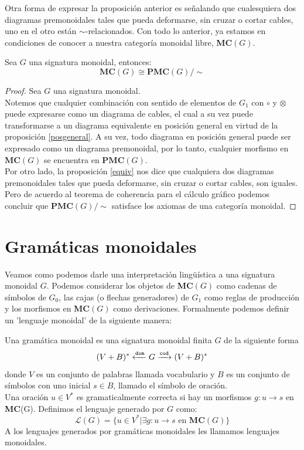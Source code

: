 \documentclass[../main.tex]{subfiles}
\begin{document}
Otra forma de expresar la proposición anterior es señalando que cualesquiera dos diagramas premonoidales tales que pueda deformarse, sin cruzar o cortar cables, uno en el otro están $\sim$-relacionados. Con todo lo anterior, ya estamos en condiciones de conocer a nuestra categoría monoidal libre, \textbf{MC}$(G)$.

\begin{prop}
	Sea $G$ una signatura monoidal, entonces:
	$$\textbf{MC}(G) \cong \textbf{PMC}(G) / \sim$$
\end{prop}

\begin{proof}
	Sea $G$ una signatura monoidal. \\
	Notemos que cualquier combinación con sentido de elementos de $G_1$ con $\circ$ y $\otimes$ puede expresarse como un diagrama de cables, el cual a su vez puede transformarse a un diagrama equivalente en posición general en virtud de la proposición \ref{posgeneral}. A su vez, todo diagrama en posición general puede ser expresado como un diagrama premonoidal, por lo tanto, cualquier morfismo en $\textbf{MC}(G)$ se encuentra en $\textbf{PMC}(G)$. \\
	Por otro lado, la proposición \ref{equiv} nos dice que cualquiera dos diagramas premonoidales tales que pueda deformarse, sin cruzar o cortar cables, son iguales. Pero de acuerdo al teorema de coherencia para el cálculo gráfico podemos concluir que $\textbf{PMC}(G) / \sim$ satisface los axiomas de una categoría monoidal. 
\end{proof}

\section{Gramáticas monoidales}

Veamos como podemos darle una interpretación lingüística a  una signatura monoidal $G$. Podemos considerar los objetos de \textbf{MC}$(G)$ como cadenas de símbolos de $G_0$, las cajas (o flechas generadores) de $G_1$ como reglas de producción y los morfismos en \textbf{MC}$(G)$ como derivaciones. Formalmente podemos definir un 'lenguaje monoidal' de la siguiente manera:

\begin{dfn}
	Una gramática monoidal es una signatura monoidal finita $G$ de la siguiente forma
	$$(V+B)^* \xleftarrow{\tt{dom}} G \xrightarrow{\tt{cod}} (V+B)^*$$
	donde $V$ es un conjunto de palabras llamada vocabulario y $B$ es un conjunto de símbolos con uno inicial $s \in B$, llamado el símbolo de oración. \\
	Una oración $u \in V^*$ es gramaticalmente correcta si hay un morfismos $g:u \to s$ en \textbf{MC}(G). Definimos el lenguaje generado por $G$ como:
	$$\mathcal{L}(G)= \{ u \in V^* | \exists g: u \to s \text{ en } \textbf{MC}(G)\}$$
	A los lenguajes generados por gramáticas monoidales les llamamos lenguajes monoidales. 
\end{dfn}
\end{document}
